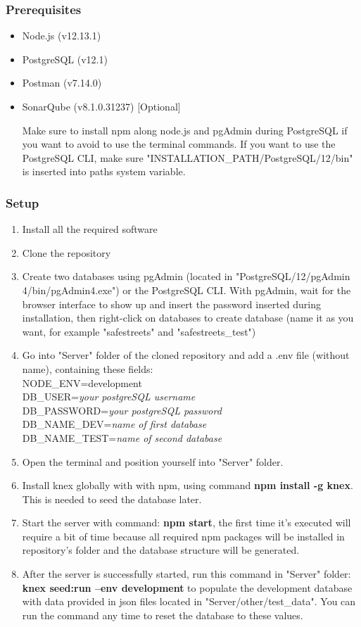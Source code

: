\subsubsection{Prerequisites}
\begin{itemize}
	\item Node.js (v12.13.1)
	\item PostgreSQL (v12.1)
	\item Postman (v7.14.0)
	\item SonarQube (v8.1.0.31237)	[Optional]
	
	Make sure to install npm along node.js and pgAdmin during PostgreSQL if you want to avoid to use the terminal commands. If you want to use the PostgreSQL CLI, make sure "INSTALLATION\_PATH/PostgreSQL/12/bin" is inserted into paths system variable.
\end{itemize}

\subsubsection{Setup}
\begin{enumerate}
	\item Install all the required software
	\item Clone the repository
	\item Create two databases using pgAdmin (located in "PostgreSQL/12/pgAdmin 4/bin/pgAdmin4.exe") or the PostgreSQL CLI. With pgAdmin, wait for the browser interface to show up and insert the password inserted during installation, then right-click on databases to create database (name it as you want, for example "safestreets" and "safestreets\_test")
	\item Go into "Server" folder of the cloned repository and add a .env file (without name), containing these fields:\\
	NODE\_ENV=development\\
	DB\_USER=\textit{your postgreSQL username}\\
	DB\_PASSWORD=\textit{your postgreSQL password}\\
	DB\_NAME\_DEV=\textit{name of first database}\\
	DB\_NAME\_TEST=\textit{name of second database}\\
	\item Open the terminal and position yourself into "Server" folder.
	\item Install knex globally with with npm, using command \textbf{npm install -g knex}. This is needed to seed the database later.
	\item Start the server with command: \textbf{npm start}, the first time it's executed will require a bit of time because all required npm packages will be installed in repository's folder and the database structure will be generated.
	\item After the server is successfully started, run this command in "Server" folder: \textbf{knex seed:run --env development} to populate the development database with data provided in json files located in "Server/other/test\_data". You can run the command any time to reset the database to these values.
\end{enumerate}

